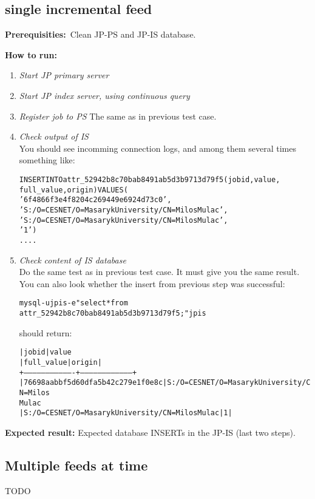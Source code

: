 \documentclass{egee}
\def\req{\noindent\textbf{Prerequisities:}}
\def\how{\noindent\textbf{How to run:}}
\def\result{\noindent\textbf{Expected result:}}
\begin{document}
\subsection{single incremental feed}

\req\ Clean JP-PS and JP-IS database.

\how\
\begin{enumerate}
 \item \emph{Start JP primary server}
 \item \emph{Start JP index server, using continuous query}
 \item \emph{Register job to PS}
  The same as in previous test case.

 \item \emph{Check output of IS}\\
  You should see incomming connection logs, and among them
  several times something like:
  \begin{alltt}
    
   INSERT INTO attr_52942b8c70bab8491ab5d3b9713d79f5 (jobid, value,
                                        full_value, origin) VALUES (
     '6f4866f3e4f8204c269449e6924d73c0',
     'S:/O=CESNET/O=Masaryk University/CN=Milos Mulac',
     'S:/O=CESNET/O=Masaryk University/CN=Milos Mulac',
     '1')
   ....
  \end{alltt}
 \item \emph{Check content of IS database}\\
 Do the same test as in previous test case. It must give you the same
 result. You can also look whether the insert from previous step was 
 successful:
 \begin{alltt}
  mysql -u jpis -e "select * from
    attr_52942b8c70bab8491ab5d3b9713d79f5;" jpis
 \end{alltt}
  should return:
 \begin{alltt}
| jobid                            | value
| full_value                                      | origin |
+----------------------------------+-----------------------------------+
| 76698aabbf5d60dfa5b42c279e1f0e8c | S:/O=CESNET/O=Masaryk University/CN=Milos
Mulac 
| S:/O=CESNET/O=Masaryk University/CN=Milos Mulac |      1 |
 \end{alltt}
\end{enumerate}
\result{} Expected database INSERTs in the JP-IS (last two steps).

\subsection{Multiple feeds at time}
TODO
\end{document}
